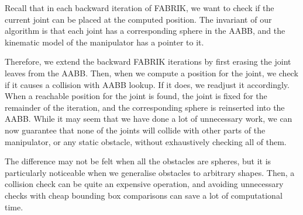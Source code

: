 Recall that in each backward iteration of FABRIK, we want to check if the current joint can be placed at the computed position. The invariant of our algorithm is that each joint has a corresponding sphere in the AABB, and the kinematic model of the manipulator has a pointer to it.

Therefore, we extend the backward FABRIK iterations by first erasing the joint leaves from the AABB. Then, when we compute a position for the joint, we check if it causes a collision with AABB lookup. If it does, we readjust it accordingly. When a reachable position for the joint is found, the joint is fixed for the remainder of the iteration, and the corresponding sphere is reinserted into the AABB. While it may seem that we have done a lot of unnecessary work, we can now guarantee that none of the joints will collide with other parts of the manipulator, or any static obstacle, without exhaustively checking all of them.

The difference may not be felt when all the obstacles are spheres, but it is particularly noticeable when we generalise obstacles to arbitrary shapes. Then, a collision check can be quite an expensive operation, and avoiding unnecessary checks with cheap bounding box comparisons can save a lot of computational time.
